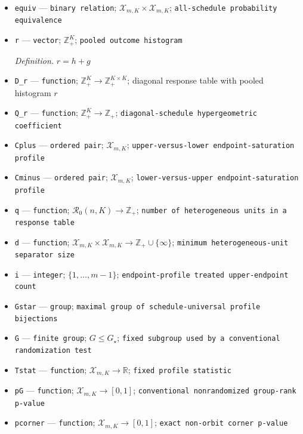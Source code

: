 \documentclass{article}
\begin{document}
\begin{itemize}
  \item \texttt{equiv} --- \texttt{binary relation}; \(\mathcal X_{m,K}\times\mathcal X_{m,K}\); \texttt{all-\allowbreak{}schedule probability equivalence}
  \item \texttt{r} --- \texttt{vector}; \(\mathbb Z_+^K\); \texttt{pooled outcome histogram}
  \par\smallskip\noindent\emph{Definition.} \(r=h+g\)
  \item \texttt{D\_\allowbreak{}r} --- \texttt{function}; \(\mathbb Z_+^K\to\mathbb Z_+^{K\times K}\); diagonal response table with pooled histogram \(r\)
  \item \texttt{Q\_\allowbreak{}r} --- \texttt{function}; \(\mathbb Z_+^K\to\mathbb Z_+\); \texttt{diagonal-\allowbreak{}schedule hypergeometric coefficient}
  \item \texttt{Cplus} --- \texttt{ordered pair}; \(\mathcal X_{m,K}\); \texttt{upper-\allowbreak{}versus-\allowbreak{}lower endpoint-\allowbreak{}saturation profile}
  \item \texttt{Cminus} --- \texttt{ordered pair}; \(\mathcal X_{m,K}\); \texttt{lower-\allowbreak{}versus-\allowbreak{}upper endpoint-\allowbreak{}saturation profile}
  \item \texttt{q} --- \texttt{function}; \(\mathcal R_0(n,K)\to\mathbb Z_+\); \texttt{number of heterogeneous units in a response table}
  \item \texttt{d} --- \texttt{function}; \(\mathcal X_{m,K}\times\mathcal X_{m,K}\to\mathbb Z_+\cup\{\infty\}\); \texttt{minimum heterogeneous-\allowbreak{}unit separator size}
  \item \texttt{i} --- \texttt{integer}; \(\{1,\ldots,m-1\}\); \texttt{endpoint-\allowbreak{}profile treated upper-\allowbreak{}endpoint count}
  \item \texttt{Gstar} --- \texttt{group}; \texttt{maximal group of schedule-\allowbreak{}universal profile bijections}
  \item \texttt{G} --- \texttt{finite group}; \(G\leq G_\star\); \texttt{fixed subgroup used by a conventional randomization test}
  \item \texttt{Tstat} --- \texttt{function}; \(\mathcal X_{m,K}\to\mathbb R\); \texttt{fixed profile statistic}
  \item \texttt{pG} --- \texttt{function}; \(\mathcal X_{m,K}\to[0,1]\); \texttt{conventional nonrandomized group-\allowbreak{}rank p-\allowbreak{}value}
  \item \texttt{pcorner} --- \texttt{function}; \(\mathcal X_{m,K}\to[0,1]\); \texttt{exact non-\allowbreak{}orbit corner p-\allowbreak{}value}

\end{itemize}
\end{document}
